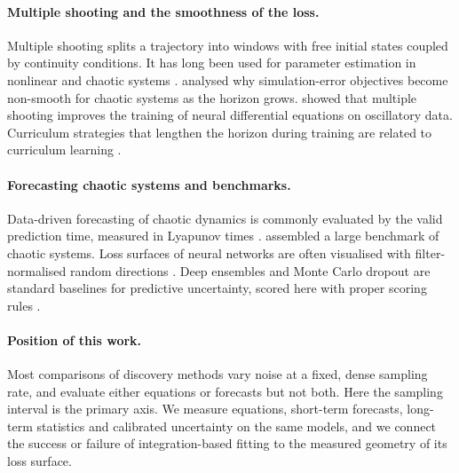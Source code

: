 \paragraph{Multiple shooting and the smoothness of the loss.}
Multiple shooting \parencite{bock1984multiple} splits a trajectory into windows with free initial states coupled by continuity conditions. It has long been used for parameter estimation in nonlinear and chaotic systems \parencite{voss2004identification,peifer2007multiple}. \textcite{ribeiro2020smoothness} analysed why simulation-error objectives become non-smooth for chaotic systems as the horizon grows. \textcite{turan2022multiple} showed that multiple shooting improves the training of neural differential equations on oscillatory data. Curriculum strategies that lengthen the horizon during training are related to curriculum learning \parencite{bengio2009curriculum}.

\paragraph{Forecasting chaotic systems and benchmarks.}
Data-driven forecasting of chaotic dynamics is commonly evaluated by the valid prediction time, measured in Lyapunov times \parencite{pathak2018reservoir,vlachas2020backprop}. \textcite{gilpin2021chaos} assembled a large benchmark of chaotic systems. Loss surfaces of neural networks are often visualised with filter-normalised random directions \parencite{li2018landscape}. Deep ensembles \parencite{lakshminarayanan2017ensembles} and Monte Carlo dropout \parencite{gal2016dropout} are standard baselines for predictive uncertainty, scored here with proper scoring rules \parencite{gneiting2007scoring}.

\paragraph{Position of this work.}
Most comparisons of discovery methods vary noise at a fixed, dense sampling rate, and evaluate either equations or forecasts but not both. Here the sampling interval is the primary axis. We measure equations, short-term forecasts, long-term statistics and calibrated uncertainty on the same models, and we connect the success or failure of integration-based fitting to the measured geometry of its loss surface.
